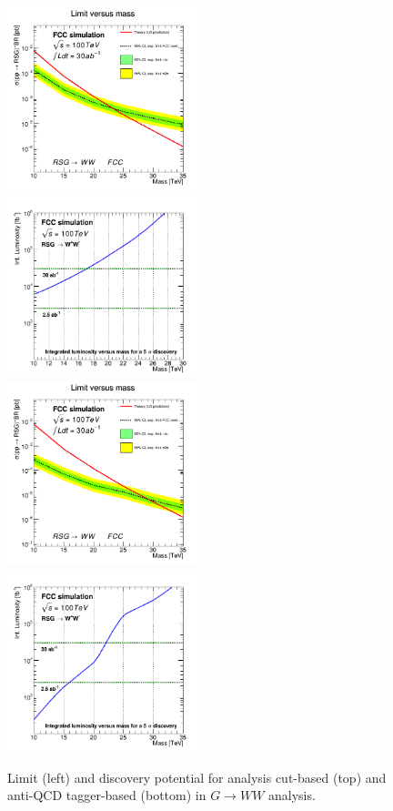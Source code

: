 \documentclass{cernrep}
\begin{document}
\begin{figure}[!htb]\centering
\includegraphics[width=0.495\textwidth]{Fig/RSGww/cut/lim_RSGraviton_ww_fcc_v02.png}
\includegraphics[width=0.495\textwidth]{Fig/RSGww/cut/DiscoveryPotential_ww_rootStyle.png}
\includegraphics[width=0.495\textwidth]{Fig/RSGww/tagger/lim_RSGraviton_ww_fcc_v02.png}
\includegraphics[width=0.495\textwidth]{Fig/RSGww/tagger/DiscoveryPotential_ww_rootStyle.png}
\caption{Limit (left) and discovery potential for analysis cut-based (top) and anti-QCD tagger-based (bottom) in $G \rightarrow WW$ analysis.}
\label{fig:RSWww_limit}
\end{figure}
\end{document}
